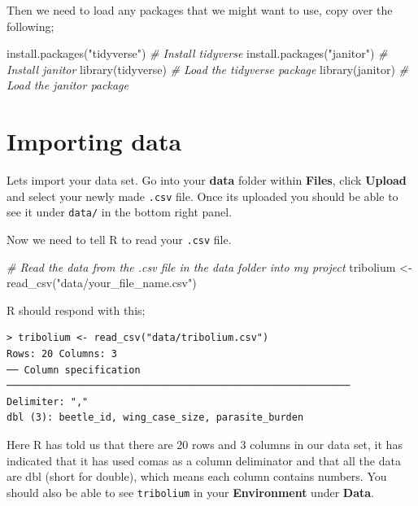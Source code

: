 \documentclass[
]{book}
\newenvironment{Shaded}{\begin{snugshade}}{\end{snugshade}}
\newcommand{\CommentTok}[1]{\textcolor[rgb]{0.56,0.35,0.01}{\textit{#1}}}
\newcommand{\FunctionTok}[1]{\textcolor[rgb]{0.00,0.00,0.00}{#1}}
\newcommand{\NormalTok}[1]{#1}
\newcommand{\OtherTok}[1]{\textcolor[rgb]{0.56,0.35,0.01}{#1}}
\newcommand{\StringTok}[1]{\textcolor[rgb]{0.31,0.60,0.02}{#1}}
\begin{document}
Then we need to load any packages that we might want to use, copy over the following;

\begin{Shaded}
\begin{Highlighting}[]
\FunctionTok{install.packages}\NormalTok{(}\StringTok{"tidyverse"}\NormalTok{) }\CommentTok{\# Install tidyverse}
\FunctionTok{install.packages}\NormalTok{(}\StringTok{"janitor"}\NormalTok{) }\CommentTok{\# Install janitor}
\FunctionTok{library}\NormalTok{(tidyverse) }\CommentTok{\# Load the tidyverse package}
\FunctionTok{library}\NormalTok{(janitor) }\CommentTok{\# Load the janitor package}
\end{Highlighting}
\end{Shaded}

\hypertarget{importing}{%
\section{Importing data}\label{importing}}

Lets import your data set. Go into your \textbf{data} folder within \textbf{Files}, click \textbf{Upload} and select your newly made \texttt{.csv} file. Once its uploaded you should be able to see it under \texttt{data/} in the bottom right panel.

Now we need to tell R to read your \texttt{.csv} file.

\begin{Shaded}
\begin{Highlighting}[]
\CommentTok{\# Read the data from the .csv file in the data folder into my project}
\NormalTok{tribolium }\OtherTok{\textless{}{-}} \FunctionTok{read\_csv}\NormalTok{(}\StringTok{"data/your\_file\_name.csv"}\NormalTok{) }
\end{Highlighting}
\end{Shaded}

R should respond with this;

\begin{verbatim}
> tribolium <- read_csv("data/tribolium.csv")
Rows: 20 Columns: 3                                                              
── Column specification ───────────────────────────────────────────────────────────
Delimiter: ","
dbl (3): beetle_id, wing_case_size, parasite_burden
\end{verbatim}

Here R has told us that there are 20 rows and 3 columns in our data set, it has indicated that it has used comas as a column deliminator and that all the data are dbl (short for double), which means each column contains numbers. You should also be able to see \texttt{tribolium} in your \textbf{Environment} under \textbf{Data}.
\end{document}
